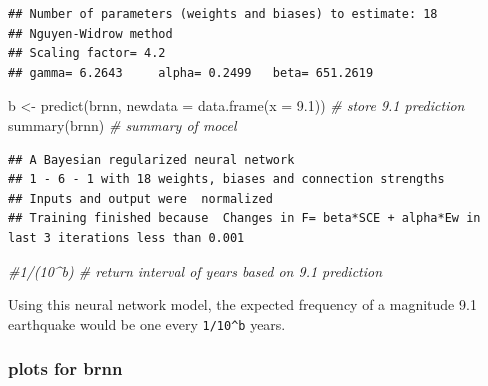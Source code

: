 \documentclass[
]{article}
\newenvironment{Shaded}{\begin{snugshade}}{\end{snugshade}}
\newcommand{\AttributeTok}[1]{\textcolor[rgb]{0.77,0.63,0.00}{#1}}
\newcommand{\CommentTok}[1]{\textcolor[rgb]{0.56,0.35,0.01}{\textit{#1}}}
\newcommand{\FloatTok}[1]{\textcolor[rgb]{0.00,0.00,0.81}{#1}}
\newcommand{\FunctionTok}[1]{\textcolor[rgb]{0.00,0.00,0.00}{#1}}
\newcommand{\NormalTok}[1]{#1}
\newcommand{\OtherTok}[1]{\textcolor[rgb]{0.56,0.35,0.01}{#1}}
\begin{document}
\begin{verbatim}
## Number of parameters (weights and biases) to estimate: 18 
## Nguyen-Widrow method
## Scaling factor= 4.2 
## gamma= 6.2643     alpha= 0.2499   beta= 651.2619
\end{verbatim}

\begin{Shaded}
\begin{Highlighting}[]
\NormalTok{b }\OtherTok{\textless{}{-}} \FunctionTok{predict}\NormalTok{(brnn, }\AttributeTok{newdata =} \FunctionTok{data.frame}\NormalTok{(}\AttributeTok{x =} \FloatTok{9.1}\NormalTok{)) }\CommentTok{\# store 9.1 prediction}
\FunctionTok{summary}\NormalTok{(brnn)                                     }\CommentTok{\# summary of mocel}
\end{Highlighting}
\end{Shaded}

\begin{verbatim}
## A Bayesian regularized neural network 
## 1 - 6 - 1 with 18 weights, biases and connection strengths
## Inputs and output were  normalized
## Training finished because  Changes in F= beta*SCE + alpha*Ew in last 3 iterations less than 0.001
\end{verbatim}

\begin{Shaded}
\begin{Highlighting}[]
\CommentTok{\#1/(10\^{}b) \# return interval of years based on 9.1 prediction}
\end{Highlighting}
\end{Shaded}

Using this neural network model, the expected frequency of a magnitude
9.1 earthquake would be one every \texttt{1/10\^{}b} years.

\hypertarget{plots-for-brnn}{%
\subsubsection{plots for brnn}\label{plots-for-brnn}}
\end{document}

